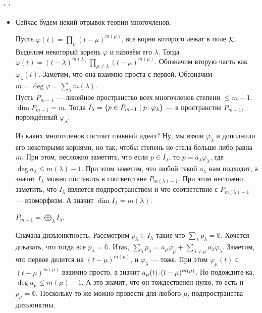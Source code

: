 \documentclass{article}
\begin{document}
    \paragraph{. .}
    \begin{itemize}
        \item[]
        \begin{Comment}
            Сейчас будем некий отрывок теории многочленов.
        \end{Comment}
        \dfn Пусть $\varphi(t)=\prod\limits_{\mu}(t-\mu)^{m(\mu)}$, все корни которого лежат в поле ${\mathcal{K}}$. Выделим некоторый корень $\varphi$ и назовём его $\lambda$. Тогда $\varphi(t)=(t-\lambda)^{m(\lambda)}\prod\limits_{\mu\neq\lambda}(t-\mu)^{m(\mu)}$. Обозначим вторую часть как $\varphi_\lambda(t)$. Заметим, что она взаимно проста с первой. Обозначим $m=\deg\varphi=\sum\limits_\lambda m(\lambda)$.\\
        Пусть $P_{m-1}$ --- линейное пространство всех многочленов степени $\leqslant m-1$. $\dim P_{m-1}=m$. Тогда $I_\lambda=\{p\in P_{m-1}\mid p\divby\varphi_\lambda\}$ ---  в пространстве $P_{m-1}$, порождённый $\varphi_\lambda$.
        \begin{Comment}
            Из каких многочленов состоит главный идеал? Ну, мы взяли $\varphi_\lambda$ и дополнили его некоторыми корнями, но так, чтобы степень не стала больше либо равна $m$. При этом, несложно заметить, что если $p\in I_\lambda$, то $p=a_\lambda\varphi_\lambda$, где $\deg a_\lambda\leqslant m(\lambda)-1$. При этом заметим, что любой такой $a_\lambda$ нам подходит, а значит $I_\lambda$ можно поставить в соответствие $P_{m(\lambda)-1}$. При этом несложно заметить, что $I_\lambda$ является подпространством и что соответствие с $P_{m(\lambda)-1}$ --- изоморфизм. А значит $\dim I_\lambda=m(\lambda)$.
        \end{Comment}
        \thm $P_{m-1}=\bigoplus\limits_\lambda I_\lambda$.
        \begin{Proof}
            Сначала дизъюнктность. Рассмотрим $p_\lambda\in I_\lambda$ такие что $\sum\limits_\lambda p_\lambda=\mathbb0$. Хочется доказать, что тогда все $p_\lambda=\mathbb0$. Итак, $\sum\limits_\lambda p_\lambda=a_\mu\varphi_\mu+\sum\limits_{\lambda\neq\mu}a_\lambda\varphi_\lambda$. Заметим, что первое делится на $(t-\mu)^{m(\mu)}$, и $\varphi_\lambda$ --- тоже. При этом $\varphi_\mu(t)$ с $(t-\mu)^{m(\mu)}$ взаимно просто, а значит $a_\mu(t)\divby(t-\mu)^{m(\mu)}$. Но подождите-ка, $\deg a_\mu\leqslant m(\mu)-1$. А это значит, что он тождественен нулю, то есть и $p_\mu=\mathbb0$. Поскольку то же можно провести для любого $\mu$, подпространства дизъюнктны.\\

\end{Proof}
\end{itemize}
\end{document}
